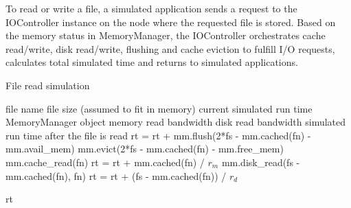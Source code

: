 \documentclass[conference]{IEEEtran}
\newcommand{\Desc}[2]{\State \makebox[2em][l]{#1}#2}
\begin{document}
			To read or write a file, a simulated application sends a request to the 
			IOController instance on the node where the requested file is stored.
			Based on the memory status in MemoryManager, the IOController 
			orchestrates cache read/write, disk read/write, flushing and cache eviction 
			to fulfill I/O requests, calculates total simulated time and returns to 
			simulated applications.
			
			\begin{algorithm}\caption{File read simulation}\label{alg:read}
				\small
				\begin{algorithmic}[1]
					\Input
        				\Desc{fn}{file name}
        				\Desc{fs}{file size (assumed to fit in memory)}
						\Desc{rt}{current simulated run time}
						\Desc{mm}{MemoryManager object}
						\Desc{$r_m$}{memory read bandwidth}
						\Desc{$r_d$}{disk read bandwidth}
   					\EndInput
   					\Output
						\Desc{rt}{simulated run time after the file is read}
   					\EndOutput
					\State rt = rt + mm.flush(2*fs - mm.cached(fn) - mm.avail\_mem)
					\State mm.evict(2*fs - mm.cached(fn) - mm.free\_mem) 
					  
    					\State mm.cache\_read(fn) 
						\State rt = rt + mm.cached(fn) / $r_m$
					\EndIf
					 
						\State mm.disk\_read(fs - mm.cached(fn), fn)
    					\State rt = rt + (fs - mm.cached(fn)) / $r_d$
					\EndIf					
					
					\State \Return rt
					
				\end{algorithmic}
			\end{algorithm}			
			
\end{document}

